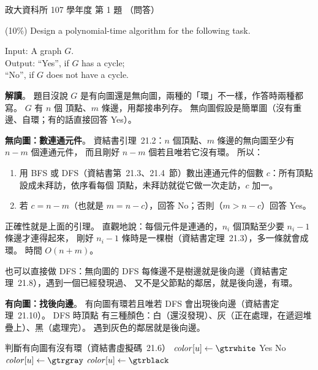 \begin{pastexam}[label={px:nccu-107-dsa-01}]{政大資科所 107 學年度 第 1 題}
（問答）

(10\%) Design a polynomial-time algorithm for the following task.

\hspace*{1.5em}Input: A graph $G$.\\
\hspace*{1.5em}Output: ``Yes'', if $G$ has a cycle;\\
\hspace*{5.2em}``No'', if $G$ does not have a cycle.
\end{pastexam}

\begin{pastsoln}
\textbf{解讀}。 題目沒說 $G$ 是有向圖還是無向圖，兩種的「環」不一樣，作答時兩種都寫。 $G$ 有 $n$ 個
頂點、$m$ 條邊，用鄰接串列存。 無向圖假設是簡單圖（沒有重邊、自環；有的話直接回答 Yes）。

\textbf{無向圖：數連通元件}。 資結書引理~21.2：$n$ 個頂點、$m$ 條邊的無向圖至少有 $n - m$ 個連通元件，
而且剛好 $n - m$ 個若且唯若它沒有環。 所以：
\begin{enumerate}
\item 用 BFS 或 DFS（資結書第~21.3、21.4~節）數出連通元件的個數 $c$：所有頂點設成未拜訪，依序看每個
頂點，未拜訪就從它做一次走訪，$c$ 加一。
\item 若 $c = n - m$（也就是 $m = n - c$），回答 No；否則（$m > n - c$）回答 Yes。
\end{enumerate}
正確性就是上面的引理。 直觀地說：每個元件是連通的，$n_i$ 個頂點至少要 $n_i - 1$ 條邊才連得起來，
剛好 $n_i - 1$ 條時是一棵樹（資結書定理~21.3），多一條就會成環。 時間 $O(n + m)$。

也可以直接做 DFS：無向圖的 DFS 每條邊不是樹邊就是後向邊（資結書定理~21.8），遇到一個已經發現過、
又不是父節點的鄰居，就是後向邊，有環。

\textbf{有向圖：找後向邊}。 有向圖有環若且唯若 DFS 會出現後向邊（資結書定理~21.10）。 DFS 時頂點
有三種顏色：白（還沒發現）、灰（正在處理，在遞迴堆疊上）、黑（處理完）。 遇到灰色的鄰居就是後向邊。
\begin{pseudo}{判斷有向圖有沒有環（資結書虛擬碼~21.6）}
        \State $\mathit{color}[u] \gets \gtrwhite$
    \EndFor
            \State \Return Yes
        \EndIf
    \EndFor
    \State \Return No
\EndFunction
{} 
    \State $\mathit{color}[u] \gets \gtrgray$
            \State \Return \TRUE {}
        \EndIf
            \State \Return \TRUE
        \EndIf
    \EndFor
    \State $\mathit{color}[u] \gets \gtrblack$
    \State \Return \FALSE
\EndFunction
\end{pseudo}


\end{pastsoln}
